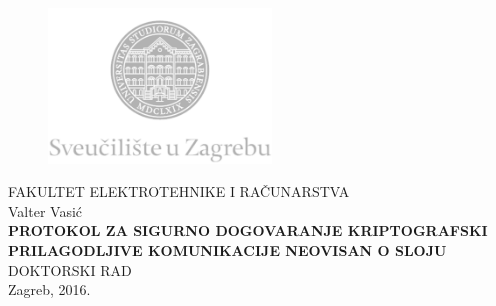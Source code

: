 \documentclass[12pt,oneside, a4paper]{book}
\begin{document}
\frontmatter

\begin{titlepage}
  \fontsize{16pt}{20pt}\selectfont
  \selectfont
  \setlength{\intextsep}{0pt plus 0pt minus 0pt}

  \begin{center}
    \begin{figure}[ht!]
      \begin{center}
        \includegraphics[height=4.1184cm, width=5.94cm]{logo_unizg1}
      \end{center}
    \end{figure}
    \vspace{0cm}
    {FAKULTET ELEKTROTEHNIKE I RAČUNARSTVA} \\
    \vspace{3cm}
    Valter Vasić \\
    \vspace{2cm}
    {\fontsize{22pt}{22pt}\selectfont\textbf{PROTOKOL ZA SIGURNO DOGOVARANJE
	    KRIPTOGRAFSKI PRILAGODLJIVE KOMUNIKACIJE NEOVISAN O SLOJU}} \\
    \vspace{2cm}  
    DOKTORSKI RAD \\    
    \vfill{Zagreb, 2016.}
  \end{center}
  \restoregeometry
\end{titlepage}
\end{document}
